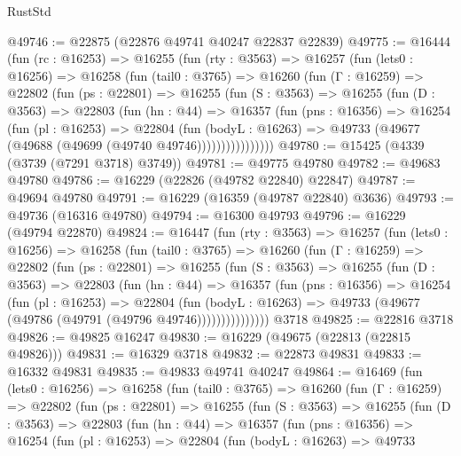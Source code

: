 \begin{lexlean}{RustStd}
\begin{coremodule}
@49746 := @22875 (@22876 @49741 @40247 @22837 @22839)
@49775 := @16444
    (fun (rc : @16253) =>
    @16255
      (fun (rty : @3563) =>
      @16257
        (fun (lets0 : @16256) =>
        @16258
          (fun (tail0 : @3765) =>
          @16260
            (fun (Γ : @16259) =>
            @22802
              (fun (ps : @22801) =>
              @16255
                (fun (S : @3563) =>
                @16255
                  (fun (D : @3563) =>
                  @22803
                    (fun (hn : @44) =>
                    @16357
                      (fun (pns : @16356) =>
                      @16254
                        (fun (pl : @16253) =>
                        @22804
                          (fun (bodyL : @16263) =>
                          @49733 (@49677 (@49688 (@49699 (@49740 @49746))))))))))))))))
@49780 := @15425 (@4339 (@3739 (@7291 @3718) @3749))
@49781 := @49775 @49780
@49782 := @49683 @49780
@49786 := @16229 (@22826 (@49782 @22840) @22847)
@49787 := @49694 @49780
@49791 := @16229 (@16359 (@49787 @22840) @3636)
@49793 := @49736 (@16316 @49780)
@49794 := @16300 @49793
@49796 := @16229 (@49794 @22870)
@49824 := @16447
    (fun (rty : @3563) =>
    @16257
      (fun (lets0 : @16256) =>
      @16258
        (fun (tail0 : @3765) =>
        @16260
          (fun (Γ : @16259) =>
          @22802
            (fun (ps : @22801) =>
            @16255
              (fun (S : @3563) =>
              @16255
                (fun (D : @3563) =>
                @22803
                  (fun (hn : @44) =>
                  @16357
                    (fun (pns : @16356) =>
                    @16254
                      (fun (pl : @16253) =>
                      @22804
                        (fun (bodyL : @16263) =>
                        @49733 (@49677 (@49786 (@49791 (@49796 @49746)))))))))))))))
    @3718
@49825 := @22816 @3718
@49826 := @49825 @16247
@49830 := @16229 (@49675 (@22813 (@22815 @49826)))
@49831 := @16329 @3718
@49832 := @22873 @49831
@49833 := @16332 @49831
@49835 := @49833 @49741 @40247
@49864 := @16469
    (fun (lets0 : @16256) =>
    @16258
      (fun (tail0 : @3765) =>
      @16260
        (fun (Γ : @16259) =>
        @22802
          (fun (ps : @22801) =>
          @16255
            (fun (S : @3563) =>
            @16255
              (fun (D : @3563) =>
              @22803
                (fun (hn : @44) =>
                @16357
                  (fun (pns : @16356) =>
                  @16254
                    (fun (pl : @16253) =>
                    @22804
                      (fun (bodyL : @16263) =>
                      @49733

\end{coremodule}
\end{lexlean}
